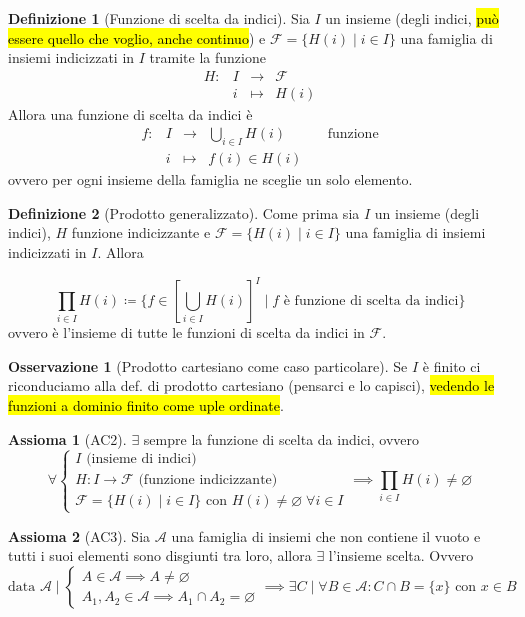 \documentclass[a4paper,10pt]{article}
\theoremstyle{definition}
\theoremstyle{indentdefinition}
\newtheorem{defn}{Definizione}[section]
\theoremstyle{indentpostulate}
\newtheorem{axiom}{Assioma}[section]
\theoremstyle{indenttheorem}
\theoremstyle{myremark}
\newtheorem*{rem*}{Osservazione}
\theoremstyle{indentgeneral}
\begin{document}
\begin{defn}[Funzione di scelta da indici]\label{defn-funzione-di-scelta-da-indici}
    Sia $I$ un insieme (degli indici, \hl{può essere quello che voglio, anche continuo}) e $\mathscr{F}=\{H(i)\mid i\in I\}$ una famiglia di insiemi indicizzati in $I$ tramite la funzione
    $$\begin{array}{cccc}
        H: & I &\to & \mathscr{F} \\
         & i & \mapsto & H(i) 
    \end{array}$$
    Allora una funzione di scelta da indici è 
    $$\begin{array}{ccccc}
        f: & I &\to & \bigcup_{i\in I}H(i) &\quad\text{funzione}\\
         & i & \mapsto & f(i)\in H(i) &
    \end{array}$$
    ovvero per ogni insieme della famiglia ne sceglie un solo elemento.
\end{defn}
\begin{defn}[Prodotto generalizzato] Come prima sia $I$ un insieme (degli indici), $H$ funzione indicizzante e $\mathscr{F}=\{H(i)\mid i\in I\}$ una famiglia di insiemi indicizzati in $I$. Allora 

$$\prod_{i\in I}H(i)\coloneqq \{f\in\left[\bigcup_{i\in I}H(i)\right]^I\mid f\text{ è funzione di scelta da indici}\}$$
    ovvero è l'insieme di tutte le funzioni di scelta da indici in $\mathscr{F}$.
\end{defn}

\begin{rem*}[Prodotto cartesiano come caso particolare] Se $I$ è finito ci riconduciamo alla def. di prodotto cartesiano (pensarci e lo capisci), \hl{vedendo le funzioni a dominio finito come uple ordinate}.
\end{rem*}

\begin{axiom}[AC2]\label{axm-ac2} $\exists$ sempre la funzione di scelta da indici, ovvero
   $$\forall \begin{cases}
        I \text{ (insieme di indici)}\\
        H:I\to\mathscr{F}  \text{ (funzione indicizzante)}\\
        \mathscr{F}=\{H(i)\mid i\in I\} \text{ con }H(i)\ne\varnothing\;\forall i\in I
    \end{cases}\implies \prod_{i\in I}H(i)\ne\varnothing$$
\end{axiom}

\begin{axiom}[AC3]\label{axm-ac3}
    Sia $\mathscr{A}$ una famiglia di insiemi che non contiene il vuoto e tutti i suoi elementi sono disgiunti tra loro, allora $\exists$ l'insieme scelta. Ovvero
    $$\text{data }\mathscr{A}\mid\begin{cases}
        A\in \mathscr{A}\implies A\ne\varnothing\\
        A_1,A_2\in \mathscr{A}\implies A_1\cap A_2=\varnothing
    \end{cases}\implies \exists C\mid \forall B\in \mathscr{A}: C\cap B=\{x\}\text{ con }x\in B$$
\end{axiom}
\end{document}

